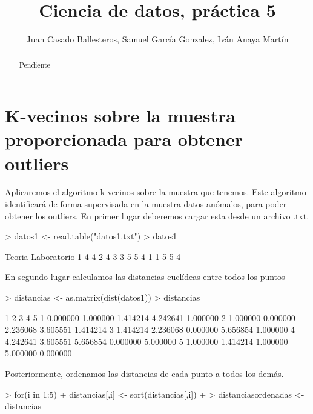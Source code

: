 \documentclass [a4paper] {article}
\title{Ciencia de datos, práctica 5}
\author{Juan Casado Ballesteros, Samuel García Gonzalez, Iván Anaya Martín}
\begin{document}
\maketitle

\begin{abstract}
Pendiente
\end{abstract}

\newpage

\newpage
\section{K-vecinos sobre la muestra proporcionada para obtener outliers}
Aplicaremos el algoritmo k-vecinos sobre la muestra que tenemos.
Este algoritmo identificará de forma supervisada en la muestra datos anómalos, para poder obtener los outliers.
En primer lugar deberemos cargar esta desde un archivo .txt.
\begin{Schunk}
\begin{Sinput}
> datos1 <- read.table("datos1.txt")
> datos1
\end{Sinput}
\begin{Soutput}
  Teoria Laboratorio
1      4           4
2      4           3
3      5           5
4      1           1
5      5           4
\end{Soutput}
\end{Schunk}

En segundo lugar calculamos las distancias euclídeas entre todos los puntos
\begin{Schunk}
\begin{Sinput}
> distancias <- as.matrix(dist(datos1))
> distancias
\end{Sinput}
\begin{Soutput}
         1        2        3        4        5
1 0.000000 1.000000 1.414214 4.242641 1.000000
2 1.000000 0.000000 2.236068 3.605551 1.414214
3 1.414214 2.236068 0.000000 5.656854 1.000000
4 4.242641 3.605551 5.656854 0.000000 5.000000
5 1.000000 1.414214 1.000000 5.000000 0.000000
\end{Soutput}
\end{Schunk}

Posteriormente, ordenamos las distancias de cada punto a todos los demás.
\begin{Schunk}
\begin{Sinput}
> for(i in 1:5){
+   distancias[,i] <- sort(distancias[,i])
+ }
> distanciasordenadas <- distancias
\end{Sinput}
\end{Schunk}
\end{document}
